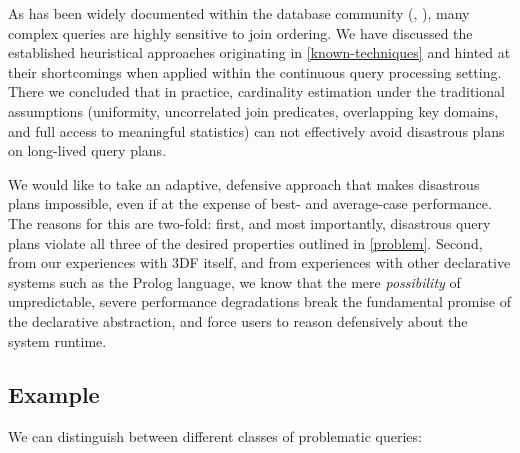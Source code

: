 \documentclass[../catalog.tex]{subfiles}
\begin{document}
As has been widely documented within the database community
(\cite{leis2015good}, \cite{lohman2014query}), many complex queries
are highly sensitive to join ordering. We have discussed the
established heuristical approaches originating in
\autoref{known-techniques} and hinted at their shortcomings when
applied within the continuous query processing setting. There we
concluded that in practice, cardinality estimation under the
traditional assumptions (uniformity, uncorrelated join predicates,
overlapping key domains, and full access to meaningful statistics) can
not effectively avoid disastrous plans on long-lived query plans.

We would like to take an adaptive, defensive approach that makes
disastrous plans impossible, even if at the expense of best- and
average-case performance. The reasons for this are two-fold: first,
and most importantly, disastrous query plans violate all three of the
desired properties outlined in \autoref{problem}. Second, from our
experiences with 3DF itself, and from experiences with other
declarative systems such as the Prolog language, we know that the mere
\emph{possibility} of unpredictable, severe performance degradations
break the fundamental promise of the declarative abstraction, and
force users to reason defensively about the system runtime.

\subsection{Example}

We can distinguish between different classes of problematic queries:
\end{document}
